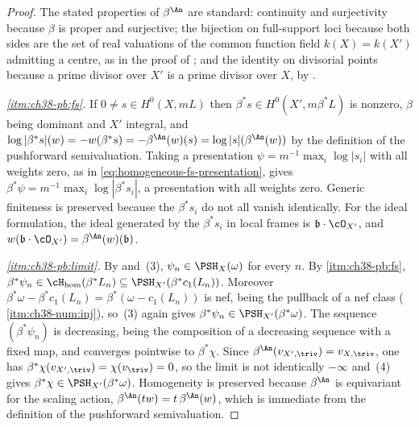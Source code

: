 \begin{proof}
The stated properties of $\beta^{\An}$ are standard: continuity and
surjectivity because $\beta$ is proper and surjective; the bijection on
full-support loci because both sides are the set of real valuations of the
common function field $k(X)=k(X')$ admitting a centre, as in the proof of
; and the identity on
divisorial points because a prime divisor over $X'$ is a prime divisor
over $X$, by .

\emph{\cref{itm:ch38-pb:fs}.}  If $0\neq s\in H^0(X,mL)$ then
$\beta^*s\in H^0(X',m\beta^*L)$ is nonzero, $\beta$ being dominant and
$X'$ integral, and
$\log|\beta^*s|(w)=-w(\beta^*s)=-\beta^{\An}(w)(s)=\log|s|(\beta^{\An}(w))$
by the definition of the pushforward semivaluation.  Taking a presentation
$\psi=m^{-1}\max_i\log|s_i|$ with all weights zero, as in
\eqref{eq:homogeneous-fs-presentation}, gives
$\beta^*\psi=m^{-1}\max_i\log|\beta^*s_i|$, a presentation with all
weights zero.  Generic finiteness is preserved because the $\beta^*s_i$
do not all vanish identically.  For the ideal formulation, the ideal
generated by the $\beta^*s_i$ in local frames is
$\mathfrak b\cdot\cO_{X'}$, and
$w(\mathfrak b\cdot\cO_{X'})=\beta^{\An}(w)(\mathfrak b)$.

\emph{\cref{itm:ch38-pb:limit}.}  By
 and \,(3),
$\psi_n\in\PSH_X(\omega)$ for every $n$.  By
\cref{itm:ch38-pb:fs}, $\beta^*\psi_n\in\cH_{\mathrm{hom}}(\beta^*L_n)
\subseteq\PSH_{X'}(\beta^*c_1(L_n))$.  Moreover
$\beta^*\omega-\beta^*c_1(L_n)=\beta^*(\omega-c_1(L_n))$ is nef, being
the pullback of a nef class
(\,\cref{itm:ch38-num:inj}), so
\,(3) again gives
$\beta^*\psi_n\in\PSH_{X'}(\beta^*\omega)$.  The sequence
$(\beta^*\psi_n)$ is decreasing, being the composition of a decreasing
sequence with a fixed map, and converges pointwise to $\beta^*\chi$.
Since $\beta^{\An}(v_{X',\triv})=v_{X,\triv}$, one has
$\beta^*\chi(v_{X',\triv})=\chi(v_{\triv})=0$, so the limit is not
identically $-\infty$ and \,(4) gives
$\beta^*\chi\in\PSH_{X'}(\beta^*\omega)$.  Homogeneity is preserved
because $\beta^{\An}$ is equivariant for the scaling action,
$\beta^{\An}(tw)=t\,\beta^{\An}(w)$, which is immediate from the
definition of the pushforward semivaluation.
\end{proof}

